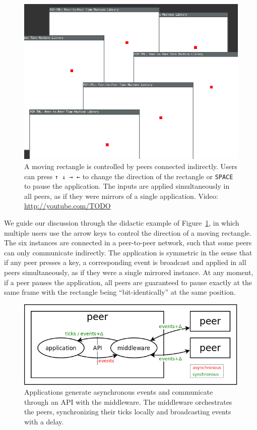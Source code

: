 \documentclass[10pt,journal,compsoc]{IEEEtran}
\newcommand{\code}[1]  {\texttt{\footnotesize{#1}}}
\begin{document}
\begin{figure}[t]
    \centering
    \includegraphics[width=\linewidth]{move}
    \caption[XXX] {
        A moving rectangle is controlled by peers connected indirectly.
        Users can press \code{↑ ↓ → ←} to change the direction of the
        rectangle or \code{SPACE} to pause the application.
        The inputs are applied simultaneously in all peers, as if they were
        mirrors of a single application.
        Video: \url{http://youtube.com/TODO}
        \label{fig.move}
    }
\end{figure}

We guide our discussion through the didactic example of Figure~\ref{fig.move},
in which multiple users use the arrow keys to control the direction of a
moving rectangle.
The six instances are connected in a peer-to-peer network, such that some
peers can only communicate indirectly.
%
The application is symmetric in the sense that if any peer presses a key, a
corresponding event is broadcast and applied in all peers simultaneously, as
if they were a single mirrored instance.
At any moment, if a peer pauses the application, all peers are guaranteed to
pause exactly at the same frame with the rectangle being ``bit-identically'' at
the same position.

\begin{figure}[t]
  \centering
  \includegraphics[width=\linewidth]{middleware}
  \caption{
    Applications generate asynchronous events and communicate through an API
    with the middleware.
    The middleware orchestrates the peers, synchronizing their ticks locally
    and broadcasting events with a delay.
    \label{fig.middleware}
  }
\end{figure}
\end{document}
